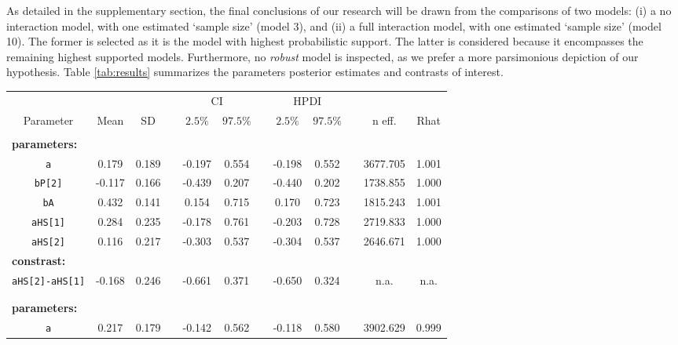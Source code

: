 As detailed in the supplementary section, the final conclusions of our research will be drawn from the comparisons of two models: (i) a no interaction model, with one estimated `sample size' (model 3), and (ii) a full interaction model, with one estimated `sample size' (model 10). The former is selected as it is the model with highest probabilistic support. The latter is considered because it encompasses the remaining highest supported models. Furthermore, no \textit{robust} model is inspected, as we prefer a more parsimonious depiction of our hypothesis. Table \ref{tab:results} summarizes the parameters posterior estimates and contrasts of interest.
%
\begin{table}[h!]
	\centering
	\begin{tabular}{|cccccccccccc|} 
		\hline
		& \multicolumn{3}{c}{} & \multicolumn{2}{c}{CI} & & \multicolumn{2}{c}{HPDI} & & \multicolumn{2}{c|}{}\\[0.5ex]
		\cline{5-6} \cline{8-9}
		Parameter & Mean & SD & & $2.5\%$ & $97.5\%$ & & $2.5\%$ & $97.5\%$ & & n eff. & Rhat \\[0.5ex] 
		\hline\hline
		\rowcolor{gray}
		\multicolumn{12}{|l|}{ \textbf{Model 3: No interaction (one `size')} } \\
		\multicolumn{12}{|l|}{ \textbf{parameters:} } \\
		\texttt{a} & 0.179 & 0.189 & & -0.197 & 0.554 & & -0.198 & 0.552 & & 3677.705 & 1.001\\
		\texttt{bP[2]} & -0.117 & 0.166 & & -0.439 & 0.207 & & -0.440 & 0.202 & & 1738.855 & 1.000 \\
		\texttt{bA} & 0.432 & 0.141 & & 0.154 & 0.715 & & 0.170 & 0.723 & & 1815.243 & 1.001 \\
		\texttt{aHS[1]} & 0.284 & 0.235 & & -0.178 & 0.761 & & -0.203 & 0.728 & & 2719.833 & 1.000 \\
		\texttt{aHS[2]} & 0.116 & 0.217 & & -0.303 & 0.537 & & -0.304 & 0.537 & & 2646.671 & 1.000 \\
		\multicolumn{12}{|l|}{ \textbf{constrast:} } \\
		\texttt{aHS[2]-aHS[1]} & -0.168 & 0.246 & & -0.661 & 0.371 & & -0.650 & 0.324 & & n.a. & n.a. \\
		\multicolumn{12}{|l|}{ } \\
		\rowcolor{gray}
		\multicolumn{12}{|l|}{ \textbf{Model 10: Full interaction (one `size')} } \\
		\multicolumn{12}{|l|}{ \textbf{parameters:} } \\
		\texttt{a} & 0.217 & 0.179 & & -0.142 & 0.562 & & -0.118 & 0.580 & & 3902.629 & 0.999 \\

\end{tabular}
\end{table}
